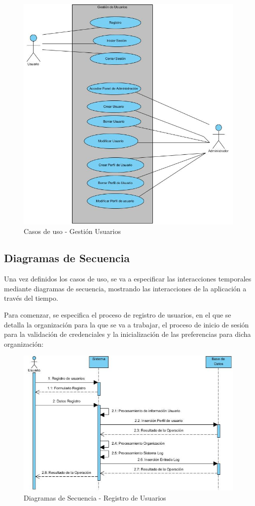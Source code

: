 \documentclass[a4paper,11pt]{book}
\begin{document}
\begin{figure}[H] 
\centering 
\includegraphics[scale=0.50]{imagenes/casosUso/Usuarios.jpg}
\caption{ Casos de uso - Gestión Usuarios  }  
\end{figure}

\subsection{Diagramas de Secuencia}
Una vez definidos los casos de uso, se va a especificar las interacciones temporales mediante diagramas de secuencia, mostrando las interacciones de la aplicación a través del tiempo. 

Para comenzar, se especifica el proceso de registro de usuarios, en el que se detalla la organización para la que se va a trabajar, el proceso de inicio de sesión para la validación de credenciales y la inicialización de las preferencias para dicha organización:

\begin{figure}[H] 
\centering 
\includegraphics[scale=0.50]{imagenes/secuencia/Registro_Usuario.jpg}
\caption{ Diagramas de Secuencia - Registro de Usuarios\cite{diagrama}  }  
\end{figure}
\end{document}
